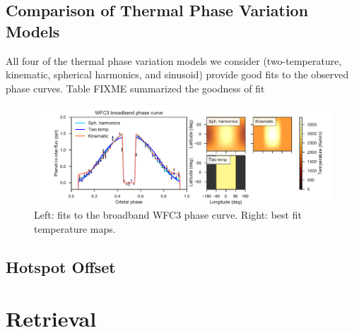 \documentclass[twocolumn]{aastex61}
\begin{document}
\subsection{Comparison of Thermal Phase Variation Models}
All four of the thermal phase variation models we consider (two-temperature, kinematic, spherical harmonics, and sinusoid) provide good fits to the observed phase curves. Table FIXME summarized the goodness of fit

\begin{figure}
\includegraphics[width = 1.0\textwidth]{Figures/hst_model_comparison.pdf}
\caption{Left: fits to the broadband WFC3 phase curve. Right: best fit temperature maps.}
\label{fig:model_comparison}
\end{figure}

\subsection{Hotspot Offset}

\section{Retrieval}
\end{document}
